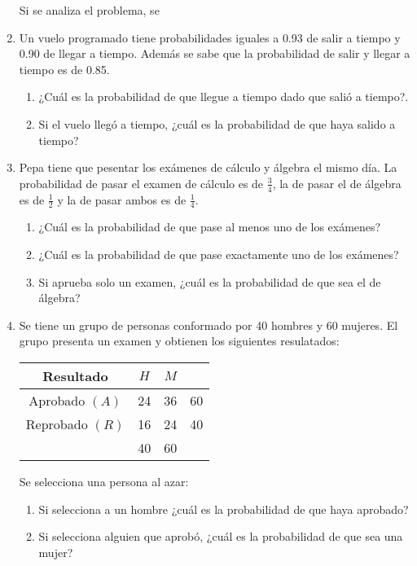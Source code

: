 \documentclass[dvipsnames,a4paper]{book}
\begin{document}
\begin{enumerate}[{Ej1. }]
Si se analiza el problema, se








\item Un vuelo programado tiene probabilidades iguales a {\color{Plum} 0.93 de
    salir a tiempo} y {\color{BlueGreen} 0.90 de llegar a tiempo}. Además se
    sabe que la probabilidad de {\color{Bittersweet} salir y llegar a tiempo es
    de 0.85}.
    \begin{enumerate}[{a) }]
        \item ¿Cuál es la probabilidad de que llegue a tiempo dado que salió a
            tiempo?.
        \item Si el vuelo llegó a tiempo, ¿cuál es la probabilidad de que haya
            salido a tiempo?
    \end{enumerate}










\item Pepa tiene que pesentar los exámenes de cálculo y álgebra el mismo día. La probabilidad de pasar el examen de cálculo es de {\color{Aquamarine} \(\frac{3}{4}\)}, la de pasar el de álgebra es de {\color{Plum} \(\frac{1}{2}\)} y la de pasar ambos es de  {\color{Thistle} \(\frac{1}{4}\)}.
    \begin{enumerate}[{a) }]
        \item ¿Cuál es la probabilidad de que pase al menos uno de los exámenes?
        \item ¿Cuál es la probabilidad de que pase exactamente uno de los exámenes?
        \item  Si aprueba solo un examen, ¿cuál es la probabilidad de que sea
            el de álgebra?
    \end{enumerate}

\item Se tiene un grupo de personas conformado por {\color{Salmon} 40 hombres} y {\color{BrickRed} 60 mujeres}. El grupo presenta un examen y obtienen los siguientes resulatados:

\begin{center}
    \begin{tabular}{ |c|c|c|c| }
        \hline
        Resultado& \(H\) & \(M\) &\\ \hline
        Aprobado \(\left(A\right) \) &24&36&60\\ \hline
        Reprobado \(\left(R\right)\) &16&24&40\\ \hline
                        &40&60&\\ \hline
    \end{tabular}
\end{center}
Se selecciona una persona al azar:
\begin{enumerate}
    \item Si selecciona a un hombre ¿cuál es la probabilidad de que haya
        aprobado?
    \item Si selecciona alguien que aprobó, ¿cuál es la probabilidad de que sea
        una mujer?
\end{enumerate}



\end{enumerate}
\end{document}
